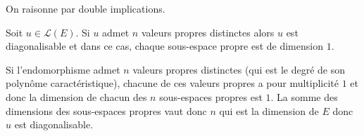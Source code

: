 \documentclass[a4paper,10pt]{report}
\begin{document}
\newpage
\begin{preuve} On raisonne par double implications.

\medskip
%
%
%

\vspace{9.cm}
\end{preuve}

\begin{cor} Soit $u \in \mathcal{L}(E)$. Si $u$ admet $n$ valeurs propres distinctes alors $u$ est diagonalisable et dans ce cas, chaque sous-espace propre est de dimension $1$.
\end{cor}



\begin{preuve} Si l'endomorphisme admet $n$ valeurs propres distinctes (qui est le degré de son polynôme caractéristique), chacune de ces valeurs propres a pour multiplicité $1$ et donc la dimension de chacun des $n$ sous-espaces propres est $1$. La somme des dimensions des sous-espaces propres vaut donc $n$ qui est la dimension de $E$ donc $u$ est diagonalisable.
\end{preuve}
\end{document}
